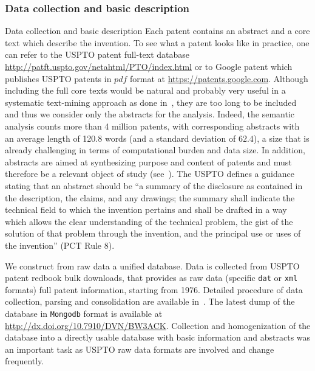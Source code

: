 \subsubsection*{Data collection and basic description}{Data collection and basic description}
Each patent contains an abstract and a core text which describe the invention. To see what a patent looks like in practice, one can refer to the USPTO patent full-text database \url{http://patft.uspto.gov/netahtml/PTO/index.html} or to Google patent which publishes USPTO patents in $pdf$ format at \url{https://patents.google.com}. Although including the full core texts would be natural and probably very useful in a systematic text-mining approach as done in~\cite{tseng2007text}, they are too long to be included and thus we consider only the abstracts for the analysis. Indeed, the semantic analysis counts more than 4 million patents, with corresponding abstracts with an average length of 120.8 words (and a standard deviation of $62.4$), a size that is already challenging in terms of computational burden and data size. In addition, abstracts are aimed at synthesizing purpose and content of patents and must therefore be a relevant object of study (see~\cite{Adams2010text}). The USPTO defines a guidance stating that an abstract should be ``a summary of the disclosure as contained in the description, the claims, and any drawings; the summary shall indicate the technical field to which the invention pertains and shall be drafted in a way which allows the clear understanding of the technical problem, the gist of the solution of that problem through the invention, and the principal use or uses of the invention'' (PCT Rule 8). 

We construct from raw data a unified database. Data is collected from USPTO patent redbook bulk downloads, that provides as raw data (specific \texttt{dat} or \texttt{xml} formats) full patent information, starting from 1976. Detailed procedure of data collection, parsing and consolidation are available in~. The latest dump of the database in \texttt{Mongodb} format is available at \url{http://dx.doi.org/10.7910/DVN/BW3ACK}. Collection and homogenization of the database into a directly usable database with basic information and abstracts was an important task as USPTO raw data formats are involved and change frequently.

